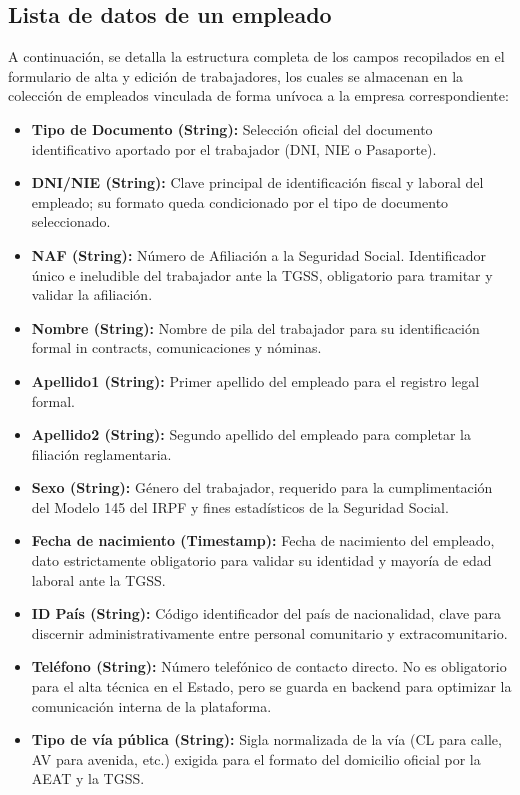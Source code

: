 \newpage

\subsection{Lista de datos de un empleado}
A continuación, se detalla la estructura completa de los campos recopilados en el formulario de alta y edición de trabajadores, los cuales se almacenan en la colección de empleados vinculada de forma unívoca a la empresa correspondiente:
\begin{itemize}
    \item \textbf{Tipo de Documento (String):} Selección oficial del documento identificativo aportado por el trabajador (DNI, NIE o Pasaporte).
    \item \textbf{DNI/NIE (String):} Clave principal de identificación fiscal y laboral del empleado; su formato queda condicionado por el tipo de documento seleccionado.
    \item \textbf{NAF (String):} Número de Afiliación a la Seguridad Social. Identificador único e ineludible del trabajador ante la TGSS, obligatorio para tramitar y validar la afiliación.
    \item \textbf{Nombre (String):} Nombre de pila del trabajador para su identificación formal in contracts, comunicaciones y nóminas.
    \item \textbf{Apellido1 (String):} Primer apellido del empleado para el registro legal formal.
    \item \textbf{Apellido2 (String):} Segundo apellido del empleado para completar la filiación reglamentaria.
    \item \textbf{Sexo (String):} Género del trabajador, requerido para la cumplimentación del Modelo 145 del IRPF y fines estadísticos de la Seguridad Social.
    \item \textbf{Fecha de nacimiento (Timestamp):} Fecha de nacimiento del empleado, dato estrictamente obligatorio para validar su identidad y mayoría de edad laboral ante la TGSS.
    \item \textbf{ID País (String):} Código identificador del país de nacionalidad, clave para discernir administrativamente entre personal comunitario y extracomunitario.
    \item \textbf{Teléfono (String):} Número telefónico de contacto directo. No es obligatorio para el alta técnica en el Estado, pero se guarda en backend para optimizar la comunicación interna de la plataforma.
    \item \textbf{Tipo de vía pública (String):} Sigla normalizada de la vía (CL para calle, AV para avenida, etc.) exigida para el formato del domicilio oficial por la AEAT y la TGSS.

\end{itemize}
